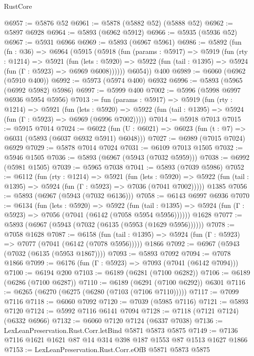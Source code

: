 \begin{lexlean}{RustCore}
\begin{coremodule}
@6957 := @5876 @52
@6961 := @5878 (@5882 @52) (@5888 @52)
@6962 := @5897 @6928
@6964 := @5893 (@6962 @5912)
@6966 := @5935 (@5936 @52)
@6967 := @5931 @6966
@6969 := @5893 (@6967 @5961)
@6986 := @5892
    (fun (fn : @36) =>
    @6964
      (@5915
        (@5918
          (fun (params : @5917) =>
          @5919
            (fun (rty : @1214) =>
            @5921
              (fun (lets : @5920) =>
              @5922 (fun (tail : @1395) => @5924 (fun (Γ : @5923) => @6969 @6008))))))
        @6054))
    @400
@6989 := @6060 (@6962 (@5910 @400))
@6992 := @5973 (@5974 @400) @6932
@6996 := @5893 (@5965 (@6992 @5982) @5986)
@6997 := @5999 @400
@7002 := @5996 (@5998 @6997 @6936 @5954 @5956)
@7013 := fun (params : @5917) =>
  @5919
    (fun (rty : @1214) =>
    @5921
      (fun (lets : @5920) =>
      @5922 (fun (tail : @1395) => @5924 (fun (Γ : @5923) => @6969 (@6996 @7002)))))
@7014 := @5918 @7013
@7015 := @5915 @7014
@7024 := @6022 (fun (U : @6021) => @6023 (fun (t : @7) => @6031 (@5893 (@6037 @6932 @5911) @6048)))
@7027 := @6989 (@7015 @7024) @6929
@7029 := @5878 @7014 @7024
@7031 := @6109 @7013 @1505
@7032 := @5946 @1505
@7036 := @5893 (@6967 (@5943 (@7032 @5959)))
@7038 := @6992 (@5981 @1505)
@7039 := @5965 @7038
@7041 := @5893 (@7039 @5986)
@7052 := @6112
    (fun (rty : @1214) =>
    @5921
      (fun (lets : @5920) =>
      @5922 (fun (tail : @1395) => @5924 (fun (Γ : @5923) => @7036 (@7041 @7002)))))
    @1385
@7056 := @5893 (@6967 (@5943 (@7032 @6136)))
@7058 := @6143 @6997 @6936
@7070 := @6134
    (fun (lets : @5920) =>
    @5922
      (fun (tail : @1395) => @5924 (fun (Γ : @5923) => @7056 (@7041 (@6142 (@7058 @5954 @5956))))))
    @1628
@7077 := @5893 (@6967 (@5943 (@7032 (@6135 (@5953 (@1629 @5956))))))
@7078 := @7058 @1628
@7087 := @6158
    (fun (tail : @1395) => @5924 (fun (Γ : @5923) => @7077 (@7041 (@6142 (@7078 @5956)))))
    @1866
@7092 := @6967 (@5943 (@7032 (@6135 (@5953 @1867))))
@7093 := @5893 @7092
@7094 := @7078 @1866
@7099 := @6176 (fun (Γ : @5923) => @7093 (@7041 (@6142 @7094)))
@7100 := @6194 @200
@7103 := @6189 (@6281 (@7100 @6282))
@7106 := @6189 (@6286 (@7100 @6287))
@7110 := @6189 (@6291 (@7100 @6292)) @6301
@7116 := @6265 (@6270 (@6275 (@6280 (@7103 (@7106 @7110)))))
@7117 := @7099 @7116
@7118 := @6060 @7092
@7120 := @7039 (@5985 @7116)
@7121 := @5893 @7120
@7124 := @5992 @7116 @6141 @7094
@7128 := @7118 (@7121 @7124) (@6332 @6966)
@7132 := @6060 @7120 @7124 (@6337 @7038)
@7136 := LexLeanPreservation.Rust.Corr.letBind @5871 @5873 @5875
@7149 := @7136 @7116 @1621 @1621 @87 @14 @314 @398 @187 @1553 @87 @1513 @1627 @1866
@7153 := LexLeanPreservation.Rust.Corr.eOfB @5871 @5873 @5875

\end{coremodule}
\end{lexlean}

